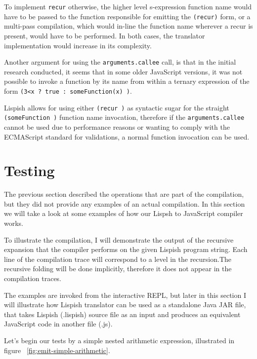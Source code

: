 To implement \texttt{recur} otherwise, the higher level s-expression function name would have to be passed to the function responsible for emitting the \texttt{(recur)} form, or a multi-pass compilation, which would in-line the function name wherever a recur is present, would have to be performed. In both cases, the translator implementation would increase in its complexity.

Another argument for using the \texttt{arguments.callee} call, is that in the initial research conducted, it seems that in some older JavaScript versions, it was not possible to invoke a function by its name from within a ternary expression of the form \texttt{(3<x ? true : someFunction(x) )}. 

Lispish allows for using either \texttt{(recur )} as syntactic sugar for the straight \texttt{(someFunction )} function name invocation, therefore if the \texttt{arguments.callee} cannot be used due to performance reasons or wanting to comply with the ECMAScript standard for validations, a normal function invocation can be used.

\section{Testing}
The previous section described the operations that are part of the compilation, but they did not provide any examples of an actual compilation. 
In this section we will take a look at some examples of how our Lispsh to JavaScript compiler works. 

To illustrate the compilation, I will demonstrate the output of the recursive expansion that the compiler performs on the given Lispish program string. 
Each line of the compilation trace will correspond to a level in the recursion.The recursive folding will be done implicitly, therefore it does not appear in the compilation traces. 

The examples are invoked from the interactive REPL, but later in this section I will illustrate how Lispish translator can be used as a standalone Java JAR file, that takes Lispish (.lispish) source file as an input and produces an equivalent JavaScript code in another file (.js).

Let's begin our tests by a simple nested arithmetic expression, illustrated in figure ~\ref{fig:emit-simple-arithmetic}.



